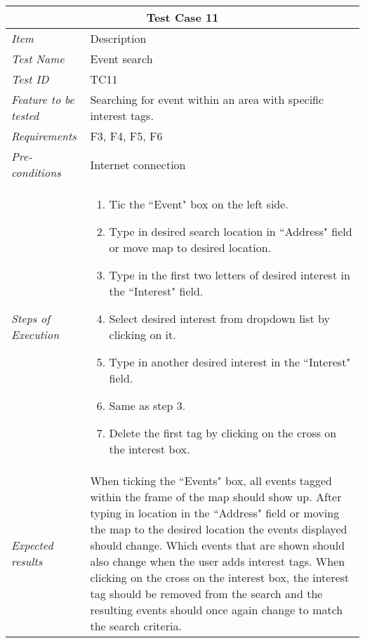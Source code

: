 %
\begin{minipage}{\linewidth}
\setlength{\tabcolsep}{15pt}
\centering
{}
\begin{tabular}{ |l|p{70mm}| }
	\hline
	\multicolumn{2}{|c|}{\cellcolor{gray!25} \textbf{Test Case 11}} \\
	\hline
	\it{\cellcolor{gray!25}Item} & {\cellcolor{gray!25} Description } \\
	\hline
	\it{\cellcolor{gray!25}Test Name } & Event search \\ \hline
	\it{\cellcolor{gray!25}Test ID} & TC11 \\ \hline
	\it{\cellcolor{gray!25}Feature to be tested} & Searching for event within an area with specific interest tags. \\ \hline
	\it{\cellcolor{gray!25}Requirements} & F3, F4, F5, F6  \\ \hline
	\it{\cellcolor{gray!25}Pre-conditions} & Internet connection \\ \hline
	\it{\cellcolor{gray!25}Steps of Execution} & \begin{enumerate}
	                                       \item Tic the ``Event" box on the left side.
	                                       \item Type in desired search location in ``Address" field or move map to desired location.
	                                       \item Type in the first two letters of desired interest in the ``Interest" field.
	                                       \item Select desired interest from dropdown list by clicking on it.
	                                       \item Type in another desired interest in the ``Interest" field.
	                                       \item Same as step 3.
	                                       \item Delete the first tag by clicking on the cross on the interest box.
	                                     \end{enumerate} \\ \hline
	\it{\cellcolor{gray!25}Expected results} & When ticking the ``Events" box, all events tagged within the frame of the map should show up. After typing in location in the ``Address" field or moving the map to the desired location the events displayed should change. Which events that are shown should also change when the user adds interest tags. When clicking on the cross on the interest box, the interest tag should be removed from the search and the resulting events should once again change to match the search criteria.  \\
	\hline
\end{tabular}
\medskip
\end{minipage}
